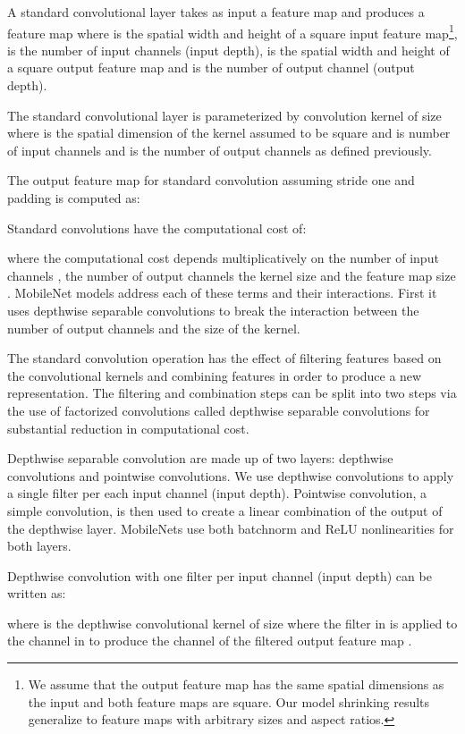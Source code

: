 \documentclass[10pt,twocolumn,letterpaper]{article}
\begin{document}
A standard convolutional layer takes as input a  feature map  and produces a  feature map  where  is the spatial width and height of a square input feature map\footnote{We assume that the output feature map has the same spatial dimensions as the input and both feature maps are square. Our model shrinking results generalize to feature maps with arbitrary sizes and aspect ratios.},  is the number of input channels (input depth),  is the spatial width and height of a square output feature map and  is the number of output channel (output depth).

The standard convolutional layer is parameterized by convolution kernel  of size  where  is the spatial dimension of the kernel assumed to be square and  is number of input channels and  is the number of output channels as defined previously. 

The output feature map for standard convolution assuming stride one and padding is computed as:



Standard convolutions have the computational cost of:


where the computational cost depends multiplicatively on the number of input channels , the number of output channels  the kernel size  and the feature map size . MobileNet models address each of these terms and their interactions. First it uses depthwise separable convolutions to break the interaction between the number of output channels and the size of the kernel. 


The standard convolution operation has the effect of filtering features based on the 
convolutional kernels and combining features in order to produce a new representation.
The filtering and combination steps can be split into two steps via the use of 
factorized convolutions called depthwise separable convolutions for substantial reduction in computational cost. 

Depthwise separable convolution are made up of two layers: depthwise convolutions and pointwise convolutions.
We use depthwise convolutions to apply a single filter per each input channel (input depth). Pointwise convolution, a
simple  convolution, is then used to create a linear combination of the output of the depthwise layer. MobileNets use both 
batchnorm and ReLU nonlinearities for both layers.

Depthwise convolution with one filter per input channel (input depth) can be written as:


where  is the depthwise convolutional kernel of size  where the  filter in  is applied to the  channel in  to produce the  channel of the filtered output feature map .
\end{document}
